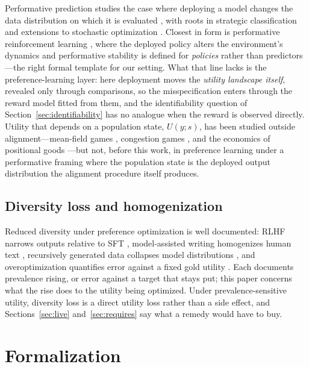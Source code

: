 ﻿\documentclass[11pt]{article}
\begin{document}
Performative prediction studies the case where deploying a model changes the data distribution on which it is evaluated \citep{perdomo2020}, with roots in strategic classification \citep{hardt2016} and extensions to stochastic optimization \citep{mendler2020}. Closest in form is performative reinforcement learning \citep{mandal2023}, where the deployed policy alters the environment's dynamics and performative stability is defined for \emph{policies} rather than predictors---the right formal template for our setting. What that line lacks is the preference-learning layer: here deployment moves the \emph{utility landscape itself}, revealed only through comparisons, so the misspecification enters through the reward model fitted from them, and the identifiability question of Section~\ref{sec:identifiability} has no analogue when the reward is observed directly. Utility that depends on a population state, \(U(y; s)\), has been studied outside alignment---mean-field games \citep{lasry2007}, congestion games \citep{rosenthal1973}, and the economics of positional goods \citep{hirsch1976, frank1985, heffetz2011}---but not, before this work, in preference learning under a performative framing where the population state is the deployed output distribution the alignment procedure itself produces.

\subsection{Diversity loss and homogenization}
\label{sec:diversity}

Reduced diversity under preference optimization is well documented: RLHF narrows outputs relative to SFT \citep{kirk2024}, model-assisted writing homogenizes human text \citep{doshi2024, padmakumar2024}, recursively generated data collapses model distributions \citep{shumailov2024}, and overoptimization quantifies error against a fixed gold utility \citep{gao2023}. Each documents prevalence rising, or error against a target that stays put; this paper concerns what the rise does to the utility being optimized. Under prevalence-sensitive utility, diversity loss is a direct utility loss rather than a side effect, and Sections~\ref{sec:live} and~\ref{sec:requires} say what a remedy would have to buy.


\section{Formalization}
\label{sec:formalization}
\end{document}
